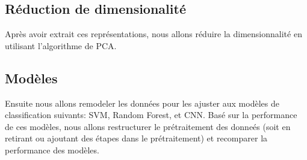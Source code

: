 \documentclass{article}
\begin{document}
\subsection*{Réduction de dimensionalité}Après avoir extrait ces représentations, nous allons réduire la dimensionnalité en utilisant l'algorithme de PCA. 
\subsection*{Modèles}Ensuite nous allons remodeler les données pour les ajuster aux modèles de classification suivants: SVM, Random Forest, et CNN. Basé sur la performance de ces modèles, nous allons restructurer le prétraitement des donneés (soit en retirant ou ajoutant des étapes dans le prétraitement) et recomparer la performance des modèles.
\end{document}
